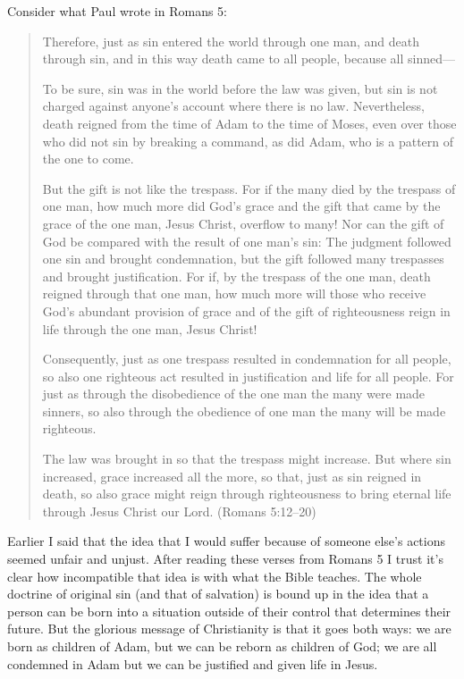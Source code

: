 Consider what Paul wrote in Romans 5:

\begin{quote}
    Therefore, just as sin entered the world through one man, and death through
    sin, and in this way death came to all people, because all sinned---

    To be sure, sin was in the world before the law was given, but sin is not
    charged against anyone's account where there is no law. Nevertheless, death
    reigned from the time of Adam to the time of Moses, even over those who did
    not sin by breaking a command, as did Adam, who is a pattern of the one to
    come.

    But the gift is not like the trespass. For if the many died by the trespass
    of one man, how much more did God's grace and the gift that came by the
    grace of the one man, Jesus Christ, overflow to many! Nor can the gift of
    God be compared with the result of one man's sin: The judgment followed one
    sin and brought condemnation, but the gift followed many trespasses and
    brought justification. For if, by the trespass of the one man, death reigned
    through that one man, how much more will those who receive God's abundant
    provision of grace and of the gift of righteousness reign in life through
    the one man, Jesus Christ!

    Consequently, just as one trespass resulted in condemnation for all people,
    so also one righteous act resulted in justification and life for all people.
    For just as through the disobedience of the one man the many were made
    sinners, so also through the obedience of one man the many will be made
    righteous.

    The law was brought in so that the trespass might increase. But where sin
    increased, grace increased all the more, so that, just as sin reigned in
    death, so also grace might reign through righteousness to bring eternal life
    through Jesus Christ our Lord. (Romans 5:12--20)
\end{quote}

Earlier I said that the idea that I would suffer because of someone else's
actions seemed unfair and unjust. After reading these verses from Romans 5 I
trust it's clear how incompatible that idea is with what the Bible teaches. The
whole doctrine of original sin (and that of salvation) is bound up in the idea
that a person can be born into a situation outside of their control that
determines their future. But the glorious message of Christianity is that it
goes both ways: we are born as children of Adam, but we can be reborn as
children of God; we are all condemned in Adam but we can be justified and given
life in Jesus.

